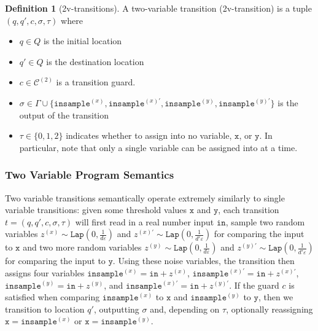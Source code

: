 \documentclass[12pt]{article}
\newcommand{\Lap}{\texttt{Lap}}
\theoremstyle{definition}
\newtheorem{defn}[thm]{Definition}
\begin{document}
\begin{defn}[2v-transitions]
    A two-variable transition (2v-transition) is a tuple $(q, q', c, \sigma, \tau)$ where \begin{itemize}
        \item $q\in Q$ is the initial location
        \item $q'\in Q$ is the destination location
        \item $c\in\mathcal{C}^{(2)}$ is a transition guard.
        \item $\sigma\in\Gamma\cup\{\texttt{insample}^{(x)}, \texttt{insample}^{(x)\prime}, \texttt{insample}^{(y)}, \texttt{insample}^{(y)\prime}\}$ is the output of the transition
        \item $\tau \in \{0, 1, 2\}$ indicates whether to assign into no variable, $\texttt{x}$, or $\texttt{y}$. In particular, note that only a single variable can be assigned into at a time. 
    \end{itemize}
\end{defn}


\subsubsection{Two Variable Program Semantics}

Two variable transitions semantically operate extremely similarly to single variable transitions: given some threshold values $\texttt{x}$ and $\texttt{y}$, each transition $t = (q, q', c, \sigma, \tau)$ will first read in a real number input $\texttt{in}$, 
sample two random variables $z^{(x)}\sim\Lap(0, \frac{1}{d\varepsilon})$ and $z^{(x)\prime}\sim\Lap(0, \frac{1}{d'\varepsilon})$ for comparing the input to $\texttt{x}$ and two more random variables $z^{(y)}\sim\Lap(0, \frac{1}{d\varepsilon})$ and $z^{(y)\prime}\sim\Lap(0, \frac{1}{d'\varepsilon})$ for comparing the input to $\texttt{y}$.
Using these noise variables, the transition then assigns four variables $\texttt{insample}^{(x)} = \texttt{in} + z^{(x)}$, $\texttt{insample}^{(x)\prime} = \texttt{in} + z^{(x)\prime}$, $\texttt{insample}^{(y)} = \texttt{in} + z^{(y)}$, and $\texttt{insample}^{(x)\prime} = \texttt{in} + z^{(y)\prime}$. 
If the guard $c$ is satisfied when comparing $\texttt{insample}^{(x)}$ to $\texttt{x}$ and $\texttt{insample}^{(y)}$ to $\texttt{y}$, then we transition to location $q'$, outputting $\sigma$ and, depending on $\tau$, optionally reassigning $\texttt{x} = \texttt{insample}^{(x)}$ or $\texttt{x} = \texttt{insample}^{(y)}$.
\end{document}
